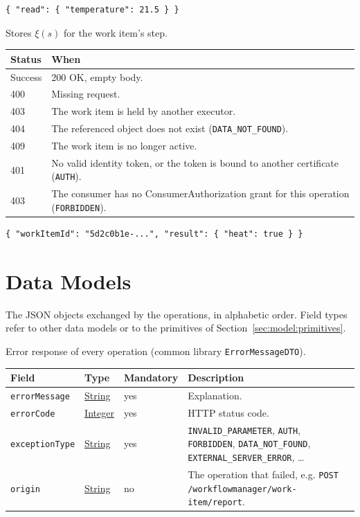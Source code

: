 \documentclass[a4paper]{arrowhead}
\newcommand{\pref}[1]{{\textcolor{ArrowheadGrey}{\hyperref[sec:model:primitives:#1]{#1}}}}
\begin{document}
\begin{lstlisting}[caption={Example response body}]
{ "read": { "temperature": 21.5 } }
\end{lstlisting}

Stores $\xi(s)$ for the work item's step.

{\small
\begin{longtable}{|p{2.0cm}|p{13.8cm}|}

\hline
\rowcolor{gray!33} Status & When \\ \hline
\endhead
Success & 200 OK, empty body. \\ \hline
400 & Missing request. \\ \hline
403 & The work item is held by another executor. \\ \hline
404 & The referenced object does not exist (\texttt{DATA\_NOT\_FOUND}). \\ \hline
409 & The work item is no longer active. \\ \hline
401 & No valid identity token, or the token is bound to another certificate (\texttt{AUTH}). \\ \hline
403 & The consumer has no ConsumerAuthorization grant for this operation (\texttt{FORBIDDEN}). \\ \hline
\end{longtable}
}


\begin{lstlisting}[caption={Example request body}]
{ "workItemId": "5d2c0b1e-...", "result": { "heat": true } }
\end{lstlisting}


\newpage
\section{Data Models}
\label{sec:model}
The JSON objects exchanged by the operations, in alphabetic order. Field types refer to other data models or to the
primitives of Section~\ref{sec:model:primitives}.

Error response of every operation (common library \texttt{ErrorMessageDTO}).

{\small
\begin{longtable}{|p{3.7cm}|p{4.2cm}|p{1.6cm}|p{6.3cm}|}

\hline
\rowcolor{gray!33} Field & Type & Mandatory & Description \\ \hline
\endhead
\texttt{errorMessage} & \pref{String} & yes & Explanation. \\ \hline
\texttt{errorCode} & \pref{Integer} & yes & HTTP status code. \\ \hline
\texttt{exceptionType} & \pref{String} & yes & \texttt{INVALID\_PARAMETER}, \texttt{AUTH}, \texttt{FORBIDDEN}, \texttt{DATA\_NOT\_FOUND}, \texttt{EXTERNAL\_SERVER\_ERROR}, \ldots \\ \hline
\texttt{origin} & \pref{String} & no & The operation that failed, e.g. \texttt{POST /workflowmanager/work-item/report}. \\ \hline
\end{longtable}
}
\end{document}
